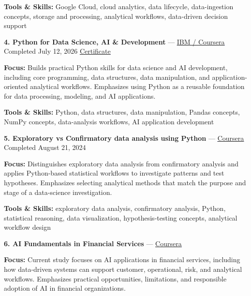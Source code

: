 \documentclass[9pt,letterpaper]{extarticle}
\begin{document}
{\small\textbf{Tools \& Skills:} Google Cloud, cloud analytics, data lifecycle, data-ingestion concepts, storage and processing, analytical workflows, data-driven decision support\par}
\vspace{2pt}
\noindent\textbf{4. Python for Data Science, AI \& Development} {\small --- \textcolor{blue}{\underline{\href{https://www.coursera.org/account/accomplishments/verify/WRA89JEJU8EE}{IBM / Coursera}}} \textbar{} Completed \textbar{} July 12, 2026 \textbar{} \textcolor{blue}{\underline{\href{https://waseemraza844.github.io/portfolio/certificates/cloud-devops/C7. Coursera WRA89JEJU8EE.pdf}{Certificate}}}}\par
\textbf{Focus:} Builds practical Python skills for data science and AI development, including core programming, data structures, data manipulation, and application-oriented analytical workflows. Emphasizes using Python as a reusable foundation for data processing, modeling, and AI applications.\par
{\small\textbf{Tools \& Skills:} Python, data structures, data manipulation, Pandas concepts, NumPy concepts, data-analysis workflows, AI application development\par}
\vspace{2pt}
\noindent\textbf{5. Exploratory vs Confirmatory data analysis using Python} {\small --- \textcolor{blue}{\underline{\href{https://www.coursera.org/account/accomplishments/verify/WDAM9O1JNEAH}{Coursera}}} \textbar{} Completed \textbar{} August 21, 2024}\par
\textbf{Focus:} Distinguishes exploratory data analysis from confirmatory analysis and applies Python-based statistical workflows to investigate patterns and test hypotheses. Emphasizes selecting analytical methods that match the purpose and stage of a data-science investigation.\par
{\small\textbf{Tools \& Skills:} exploratory data analysis, confirmatory analysis, Python, statistical reasoning, data visualization, hypothesis-testing concepts, analytical workflow design\par}
\vspace{2pt}
\noindent\textbf{6. AI Fundamentals in Financial Services} {\small --- \textcolor{blue}{\underline{\href{https://www.coursera.org/learn/ai-financial-services}{Coursera}}}}\par
\textbf{Focus:} Current study focuses on AI applications in financial services, including how data-driven systems can support customer, operational, risk, and analytical workflows. Emphasizes practical opportunities, limitations, and responsible adoption of AI in financial organizations.\par
\end{document}
